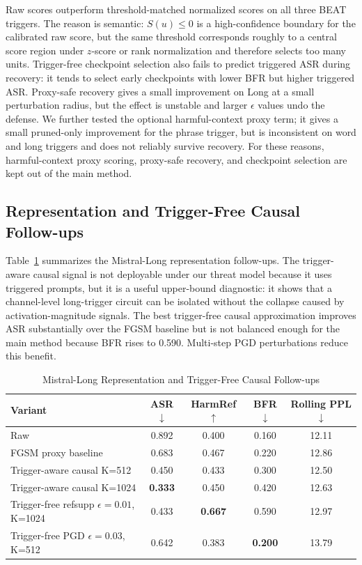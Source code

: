 \documentclass[lettersize,journal]{IEEEtran}
\begin{document}
Raw scores outperform threshold-matched normalized scores on all three BEAT triggers. The reason is semantic: $S(u)\le0$ is a high-confidence boundary for the calibrated raw score, but the same threshold corresponds roughly to a central score region under $z$-score or rank normalization and therefore selects too many units. Trigger-free checkpoint selection also fails to predict triggered ASR during recovery: it tends to select early checkpoints with lower BFR but higher triggered ASR. Proxy-safe recovery gives a small improvement on Long at a small perturbation radius, but the effect is unstable and larger $\epsilon$ values undo the defense. We further tested the optional harmful-context proxy term; it gives a small pruned-only improvement for the phrase trigger, but is inconsistent on word and long triggers and does not reliably survive recovery. For these reasons, harmful-context proxy scoring, proxy-safe recovery, and checkpoint selection are kept out of the main method.

\subsection{Representation and Trigger-Free Causal Follow-ups}
Table~\ref{tab:causal_followup} summarizes the Mistral-Long representation follow-ups. The trigger-aware causal signal is not deployable under our threat model because it uses triggered prompts, but it is a useful upper-bound diagnostic: it shows that a channel-level long-trigger circuit can be isolated without the collapse caused by activation-magnitude signals. The best trigger-free causal approximation improves ASR substantially over the FGSM baseline but is not balanced enough for the main method because BFR rises to 0.590. Multi-step PGD perturbations reduce this benefit.

\begin{table}[!t]
\caption{Mistral-Long Representation and Trigger-Free Causal Follow-ups}
\label{tab:causal_followup}
\centering
\begin{tabular}{lcccc}
\toprule
Variant & ASR$\downarrow$ & HarmRef$\uparrow$ & BFR$\downarrow$ & Rolling PPL$\downarrow$ \\
\midrule
Raw & 0.892 & 0.400 & 0.160 & 12.11 \\
FGSM proxy baseline & 0.683 & 0.467 & 0.220 & 12.86 \\
Trigger-aware causal K=512 & 0.450 & 0.433 & 0.300 & 12.50 \\
Trigger-aware causal K=1024 & \textbf{0.333} & 0.450 & 0.420 & 12.63 \\
Trigger-free refsupp $\epsilon=0.01$, K=1024 & 0.433 & \textbf{0.667} & 0.590 & 12.97 \\
Trigger-free PGD $\epsilon=0.03$, K=512 & 0.642 & 0.383 & \textbf{0.200} & 13.79 \\
\bottomrule
\end{tabular}
\end{table}
\end{document}
